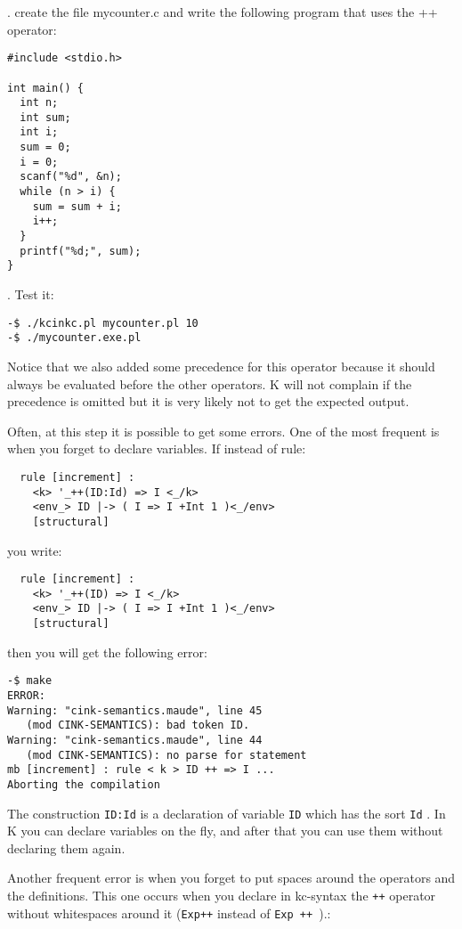 \documentclass[11pt,a4paper]{article}
\begin{document}
. create the file mycounter.c and write the following program that uses the ++ operator:

\begin{verbatim}
#include <stdio.h>

int main() {
  int n;
  int sum;
  int i;
  sum = 0;
  i = 0;
  scanf("%d", &n);
  while (n > i) {
    sum = sum + i;
    i++;
  }
  printf("%d;", sum);
}
\end{verbatim}

. Test it:

\begin{verbatim}
-$ ./kcinkc.pl mycounter.pl 10
-$ ./mycounter.exe.pl
\end{verbatim}

Notice that we also added some precedence for this operator because it should always be evaluated before the other operators. K will not complain if the precedence is omitted but it is very likely not to get the expected output.

Often, at this step it is possible to get some errors. One of the most frequent is when you forget to declare variables. If instead of rule:

\begin{verbatim}
  rule [increment] :
    <k> '_++(ID:Id) => I <_/k>
    <env_> ID |-> ( I => I +Int 1 )<_/env>
    [structural]
\end{verbatim}

you write:

\begin{verbatim}
  rule [increment] :
    <k> '_++(ID) => I <_/k>
    <env_> ID |-> ( I => I +Int 1 )<_/env>
    [structural]
\end{verbatim}

then you will get the following error:

\begin{verbatim}
-$ make
ERROR:
Warning: "cink-semantics.maude", line 45
   (mod CINK-SEMANTICS): bad token ID.
Warning: "cink-semantics.maude", line 44
   (mod CINK-SEMANTICS): no parse for statement
mb [increment] : rule < k > ID ++ => I ...
Aborting the compilation
\end{verbatim}

The construction \texttt{ID:Id} is a declaration of variable \texttt{ID} which has the sort \texttt{Id} . In K you can declare variables on the fly, and after that you can use them without declaring them again.

Another frequent error is when you forget to put spaces around the operators and the definitions. This one occurs when you declare in kc-syntax the \verb^++^ operator without whitespaces around it (\verb^Exp++^ instead of \verb^Exp ++ ^).:
\end{document}
